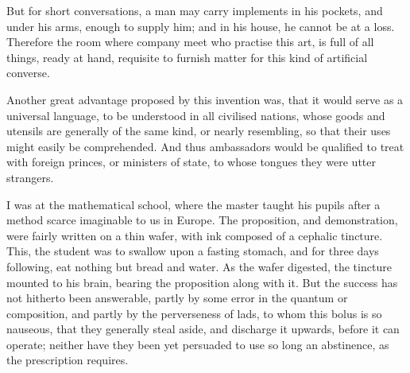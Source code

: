 But for short conversations, a man may carry implements in his pockets, and under his arms, enough to supply him; and in his house, he cannot be at a loss.  Therefore the room where company meet who practise this art, is full of all things, ready at hand, requisite to furnish matter for this kind of artificial converse.

Another great advantage proposed by this invention was, that it would serve as a universal language, to be understood in all civilised nations, whose goods and utensils are generally of the same kind, or nearly resembling, so that their uses might easily be comprehended.  And thus ambassadors would be qualified to treat with foreign princes, or ministers of state, to whose tongues they were utter strangers.

I was at the mathematical school, where the master taught his pupils after a method scarce imaginable to us in Europe.  The proposition, and demonstration, were fairly written on a thin wafer, with ink composed of a cephalic tincture.  This, the student was to swallow upon a fasting stomach, and for three days following, eat nothing but bread and water.  As the wafer digested, the tincture mounted to his brain, bearing the proposition along with it.  But the success has not hitherto been answerable, partly by some error in the quantum or composition, and partly by the perverseness of lads, to whom this bolus is so nauseous, that they generally steal aside, and discharge it upwards, before it can operate; neither have they been yet persuaded to use so long an abstinence, as the prescription requires.
